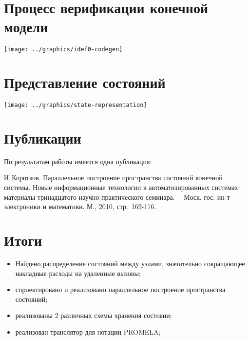 \documentclass[12pt]{article}
\begin{document}

\section{Процесс верификации конечной модели}
\label{sec:idef0}

\begin{center}
  \texttt{[image: ../graphics/idef0-codegen]}
\end{center}

\section{Представление состояний}
\label{sec:state-represent}

\begin{center}
  \texttt{[image: ../graphics/state-representation]}
\end{center}

\section{Публикации}
\label{sec:publications}

По результатам работы имеется одна публикация:

И.\,Коротков. Параллельное построение пространства состояний конечной системы. Новые
информационные технологии в автоматизированных системах: материалы тринадцатого
научно-практического семинара.~-- Моск. гос. ин-т электроники и математики. М., 2010,
стр.~169-176.

\section{Итоги}
\label{sec:publications}

\small
\begin{itemize}
\item Найдено распределение состояний между узлами, значительно сокращающее накладные
  расходы на удаленные вызовы;
\item спроектировано и реализовано параллельное построение пространства состояний;
\item реализованы 2 различных схемы хранения состояни;
\item реализован транслятор для нотации PROMELA;
\end{itemize}
\normalsize
\end{document}
